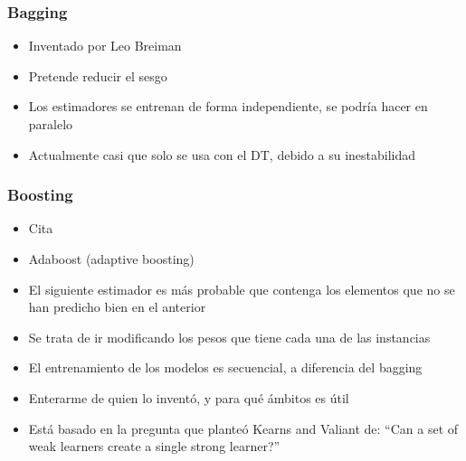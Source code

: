 \subsubsection{Bagging}
\begin{note}
  \begin{itemize}
    \item Inventado por Leo Breiman \cite{breiman_bagging}
    \item Pretende reducir el sesgo
    \item Los estimadores se entrenan de forma independiente, se podría hacer
    en paralelo
    \item Actualmente casi que solo se usa con el DT, debido a su inestabilidad
  \end{itemize}
\end{note}
\subsubsection{Boosting}
\begin{note}
\begin{itemize}
 \item Cita \cite{boosting}
 \item Adaboost (adaptive boosting)
 \item El siguiente estimador es más probable que contenga los elementos que
       no se han predicho bien en el anterior
 \item Se trata de ir modificando los pesos que tiene cada una de las instancias
 \item El entrenamiento de los modelos es secuencial, a diferencia del bagging
 \item Enterarme de quien lo inventó, y para qué ámbitos es útil
 \item Está basado en la pregunta que planteó Kearns and Valiant de:
 ``Can a set of weak learners create a single strong learner?''
\end{itemize}
\end{note}
